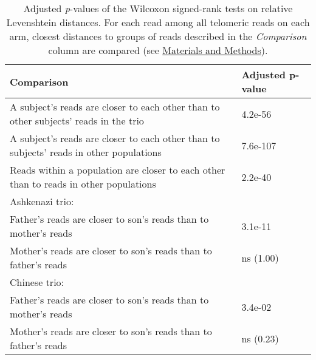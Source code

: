 \begin{samepage} \begin{table}[h!] \small \begin{tabular}{ll}
\hline
\textbf{Comparison}                                                                     & \textbf{Adjusted p-value} \\
\hline
A subject's reads are closer to each other than to other subjects' reads in the trio    & 4.2e-56                   \\
A subject's reads are closer to each other than to subjects' reads in other populations & 7.6e-107                  \\
Reads within a population are closer to each other than to reads in other populations   & 2.2e-40                   \\
Ashkenazi trio:                                                                         & \textbf{}                 \\
\hspace{.5cm} Father's reads are closer to son's reads than to mother's reads           & 3.1e-11                   \\
\hspace{.5cm} Mother's reads are closer to son's reads than to father's reads           & ns (1.00)                 \\
Chinese trio:                                                                           & \textbf{}                 \\
\hspace{.5cm} Father's reads are closer to son's reads than to mother's reads           & 3.4e-02                   \\
\hspace{.5cm} Mother's reads are closer to son's reads than to father's reads           & ns (0.23)                 \\
\hline
\end{tabular}
\caption{
    \small Adjusted \textit{p}-values of the Wilcoxon signed-rank tests on relative Levenshtein distances.
    For each read among all telomeric reads on each arm,
    closest distances to groups of reads described in the \textit{Comparison} column are compared
    (see \hyperref[sec:methods]{Materials and Methods}).
}
\label{tab:haptests}
\end{table}
\end{samepage}
